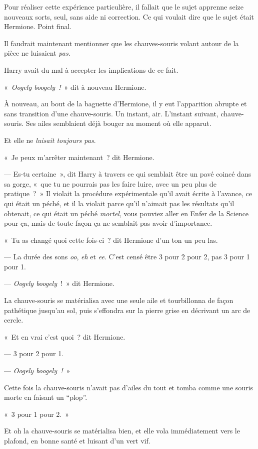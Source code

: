 Pour réaliser cette expérience particulière, il fallait que le sujet apprenne seize nouveaux sorts, seul, sans aide ni correction. Ce qui voulait dire que le sujet était Hermione. Point final.

Il faudrait maintenant mentionner que les chauves-souris volant autour de la pièce ne luisaient \emph{pas}.

Harry avait du mal à accepter les implications de ce fait.

«~\emph{Oogely boogely~!}~» dit à nouveau Hermione.

À nouveau, au bout de la baguette d'Hermione, il y eut l'apparition abrupte et sans transition d'une chauve-souris. Un instant, air. L'instant suivant, chauve-souris. Ses ailes semblaient déjà bouger au moment où elle apparut.

Et elle ne \emph{luisait toujours pas}.

«~Je peux m'arrêter maintenant~? dit Hermione.

--- Es-tu certaine~», dit Harry à travers ce qui semblait être un pavé coincé dans sa gorge, «~que tu ne pourrais pas les faire luire, avec un peu plus de pratique~?~» Il violait la procédure expérimentale qu'il avait écrite à l'avance, ce qui était un péché, et il la violait parce qu'il n'aimait pas les résultats qu'il obtenait, ce qui était un péché \emph{mortel}, vous pouviez aller en Enfer de la Science pour ça, mais de toute façon ça ne semblait pas avoir d'importance.

«~Tu as changé quoi cette fois-ci~? dit Hermione d'un ton un peu las.

--- La durée des sons \emph{oo}, \emph{eh} et \emph{ee}. C'est censé être 3 pour 2 pour 2, pas 3 pour 1 pour 1.

--- \emph{Oogely boogely}~!~» dit Hermione.

La chauve-souris se matérialisa avec une seule aile et tourbillonna de façon pathétique jusqu'au sol, puis s'effondra sur la pierre grise en décrivant un arc de cercle.

«~Et en vrai c'est quoi~? dit Hermione.

--- 3 pour 2 pour 1.

--- \emph{Oogely boogely~!}~»

Cette fois la chauve-souris n'avait pas d'ailes du tout et tomba comme une souris morte en faisant un “plop”.

«~3 pour 1 pour 2.~»

Et oh la chauve-souris se matérialisa bien, et elle vola immédiatement vers le plafond, en bonne santé et luisant d'un vert vif.

